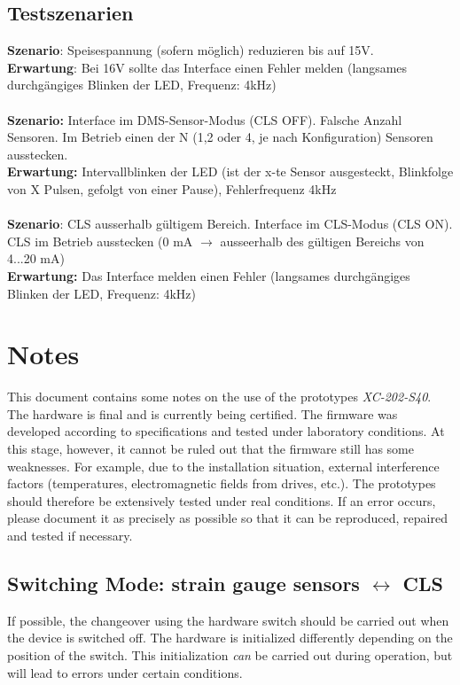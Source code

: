 \documentclass[12pt,a4paper]{article}
\begin{document}
	\subsection*{Testszenarien}
	\textbf{Szenario}: Speisespannung (sofern möglich) reduzieren bis auf 15V.\\
	\textbf{Erwartung}: Bei 16V sollte das Interface einen Fehler melden (langsames durchgängiges Blinken der LED, Frequenz: 4kHz)\\
	\\\noindent
	\textbf{Szenario:} Interface im DMS-Sensor-Modus (CLS OFF). Falsche Anzahl Sensoren. Im Betrieb einen der N (1,2 oder 4, je nach Konfiguration) Sensoren ausstecken.\\
	\textbf{Erwartung:} Intervallblinken der LED (ist der x-te Sensor ausgesteckt, Blinkfolge von X Pulsen, gefolgt von einer Pause), Fehlerfrequenz 4kHz\\
	\\\noindent
	\textbf{Szenario}: CLS ausserhalb gültigem Bereich. Interface im CLS-Modus (CLS ON). CLS im Betrieb ausstecken (0 mA $\rightarrow$ ausseerhalb des gültigen Bereichs von 4...20 mA)\\
	\textbf{Erwartung:} Das Interface melden einen Fehler (langsames durchgängiges Blinken der LED, Frequenz: 4kHz)\\
	\newpage
	\section*{Notes}
	This document contains some notes on the use of the prototypes \textit{XC-202-S40}. The hardware is final and is currently being certified. The firmware was developed according to specifications and tested under laboratory conditions. At this stage, however, it cannot be ruled out that the firmware still has some weaknesses. For example, due to the installation situation, external interference factors (temperatures, electromagnetic fields from drives, etc.). The prototypes should therefore be extensively tested under real conditions. If an error occurs, please document it as precisely as possible so that it can be reproduced, repaired and tested if necessary.
	\subsection*{Switching Mode: strain gauge sensors $\leftrightarrow$ CLS}
	If possible, the changeover using the hardware switch should be carried out when the device is switched off. The hardware is initialized differently depending on the position of the switch. This initialization \textit{can} be carried out during operation, but will lead to errors under certain conditions.
\end{document}
